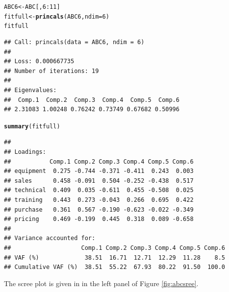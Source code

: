 \documentclass[10pt,nojss,nofooter,fleqn]{jss}\usepackage[]{graphicx}\usepackage[]{color}
\makeatletter
\newcommand{\hlnum}[1]{\textcolor[rgb]{0.686,0.059,0.569}{#1}}%
\newcommand{\hlopt}[1]{\textcolor[rgb]{0,0,0}{#1}}%
\newcommand{\hlstd}[1]{\textcolor[rgb]{0.345,0.345,0.345}{#1}}%
\newcommand{\hlkwb}[1]{\textcolor[rgb]{0.69,0.353,0.396}{#1}}%
\newcommand{\hlkwc}[1]{\textcolor[rgb]{0.333,0.667,0.333}{#1}}%
\newcommand{\hlkwd}[1]{\textcolor[rgb]{0.737,0.353,0.396}{\textbf{#1}}}%
\newenvironment{kframe}{%
 \def\at@end@of@kframe{}%
 \ifinner\ifhmode%
  \def\at@end@of@kframe{\end{minipage}}%
  \begin{minipage}{\columnwidth}%
 \fi\fi%
 \def\FrameCommand##1{\hskip\@totalleftmargin \hskip-\fboxsep
 \colorbox{shadecolor}{##1}\hskip-\fboxsep
     \hskip-\linewidth \hskip-\@totalleftmargin \hskip\columnwidth}%
 \MakeFramed {\advance\hsize-\width
   \@totalleftmargin\z@ \linewidth\hsize
   \@setminipage}}%
 {\par\unskip\endMakeFramed%
 \at@end@of@kframe}
\newenvironment{knitrout}{}{} %
\makeatother
\begin{document}
\begin{knitrout}
\color{fgcolor}\begin{kframe}
\begin{alltt}
\hlstd{ABC6} \hlkwb{<-} \hlstd{ABC[,} \hlnum{6}\hlopt{:}\hlnum{11}\hlstd{]}
\hlstd{fitfull} \hlkwb{<-} \hlkwd{princals}\hlstd{(ABC6,} \hlkwc{ndim} \hlstd{=} \hlnum{6}\hlstd{)}
\hlstd{fitfull}
\end{alltt}
\begin{verbatim}
## Call: princals(data = ABC6, ndim = 6)
## 
## Loss: 0.000667735
## Number of iterations: 19 
## 
## Eigenvalues:
##  Comp.1  Comp.2  Comp.3  Comp.4  Comp.5  Comp.6 
## 2.31083 1.00248 0.76242 0.73749 0.67682 0.50996
\end{verbatim}
\begin{alltt}
\hlkwd{summary}\hlstd{(fitfull)}
\end{alltt}
\begin{verbatim}
## 
## Loadings: 
##           Comp.1 Comp.2 Comp.3 Comp.4 Comp.5 Comp.6
## equipment  0.275 -0.744 -0.371 -0.411  0.243  0.003
## sales      0.458 -0.091  0.504 -0.252 -0.438  0.517
## technical  0.409  0.035 -0.611  0.455 -0.508  0.025
## training   0.443  0.273 -0.043  0.266  0.695  0.422
## purchase   0.361  0.567 -0.190 -0.623 -0.022 -0.349
## pricing    0.469 -0.199  0.445  0.318  0.089 -0.658
## 
## Variance accounted for:
##                    Comp.1 Comp.2 Comp.3 Comp.4 Comp.5 Comp.6
## VAF (%)             38.51  16.71  12.71  12.29  11.28    8.5
## Cumulative VAF (%)  38.51  55.22  67.93  80.22  91.50  100.0
\end{verbatim}
\end{kframe}
\end{knitrout}

The scree plot is given in in the left panel of Figure \ref{fig:abcsree}. 
\end{document}
